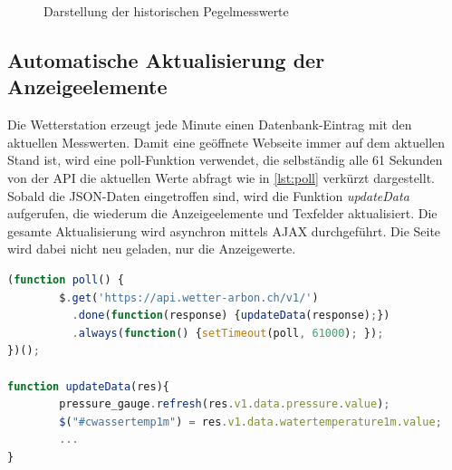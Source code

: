 \begin{figure}[h!]
	\centering
	\caption{Darstellung der historischen Pegelmesswerte}
	\label{img:histPegel}
\end{figure}



\subsection{Automatische Aktualisierung der Anzeigeelemente}
\newline
Die Wetterstation erzeugt jede Minute einen Datenbank-Eintrag mit den aktuellen Messwerten. Damit eine geöffnete Webseite immer auf dem aktuellen Stand ist, wird eine poll-Funktion verwendet, die selbständig alle 61 Sekunden von der API die aktuellen Werte abfragt wie in \ref{lst:poll} verkürzt dargestellt. Sobald die JSON-Daten eingetroffen sind, wird die Funktion \textit{updateData} aufgerufen, die wiederum die Anzeigeelemente und Texfelder aktualisiert. Die gesamte Aktualisierung wird asynchron mittels AJAX durchgeführt. Die Seite wird dabei nicht neu geladen, nur die Anzeigewerte. \newline

\begin{lstlisting}[label=lst:poll,caption=Automatische Aktualisierung der Werte, language=JavaScript, style=htmlcssjs]
(function poll() {
        $.get('https://api.wetter-arbon.ch/v1/')
          .done(function(response) {updateData(response);})
          .always(function() {setTimeout(poll, 61000); });
})();

function updateData(res){
        pressure_gauge.refresh(res.v1.data.pressure.value);
        $("#cwassertemp1m") = res.v1.data.watertemperature1m.value;
        ...
}
\end{lstlisting}


